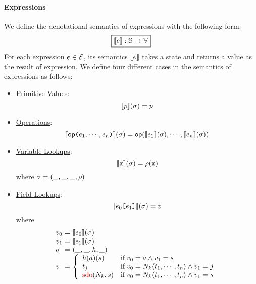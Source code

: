 \paragraph{Expressions} We define the denotational semantics of expressions with
the following form:
\[
  \framebox{$\sem{\expr}: \stset \rightarrow \valset$}
\]
For each expression $e \in \mathcal{E}$, its semantics $\llbracket{e}\rrbracket$ takes a
state and returns a value as the result of expression. We define four different
cases in the semantics of expressions as
follows:
\begin{itemize}
  \item \underline{Primitive Values}:
    \[
      \llbracket{p}\rrbracket(\sigma) = p
    \]

  \item \underline{Operations}:
    \[
      \sem{\op \kwrl \expr_1, \cdots, \expr_n \kwrr}(\st) =
      \op(\sem{\expr_1}(\st), \cdots, \sem{\expr_n}(\st))
    \]

  \item \underline{Variable Lookups}:
    \[
      \sem{\varx}(\st) = \env(\varx)
    \]
    where $\sigma = (\_, \_, \_, \rho)$

  \item \underline{Field Lookups}:
    \[
      \sem{\expr_0 \kwsl \expr_1 \kwsr}(\st) = \val
    \]
    where
    \[
      \begin{array}{l@{~}c@{~}l}
        \val_0 &=& \sem{\expr_0}(\st)\\
        \val_1 &=& \sem{\expr_1}(\st)\\
        \st &=& (\_, \_, \heap, \_)\\
        \val &=& \left\{
          \begin{array}{ll}
            \heap(\addr)(\str)
            & \text{if} \; \val_0 = \addr \wedge \val_1 = \str\\

            \tree_j
            & \text{if} \; \val_0 = \nt_k \langle \tree_1, \cdots, \tree_n
            \rangle \wedge \val_1 = j\\

            \inred{\text{sdo}}(\nt_k, \str)
            & \text{if} \; \val_0 = \nt_k \langle \tree_1, \cdots, \tree_n
            \rangle \wedge \val_1 = \str\\
          \end{array}
        \right.\\
      \end{array}
    \]
\end{itemize}

